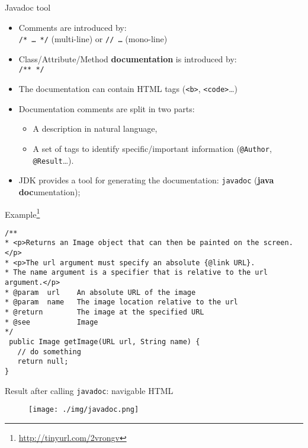 \documentclass[English,c,%
hyperref={%
    pdftitle={FISA-DE2 OOP in Java},%
    pdfauthor={Muller, Gravier, Laforest, Subercaze},%
    pdfsubject={OOP in Java},%
    pdfkeywords={OOP, Java}%
    },%
xcolor={pdftex,svgnames} %
]{beamer}
\begin{document}
\begin{frame}{Javadoc tool}
\begin{itemize}
  \item Comments are introduced by:\\
  \texttt{/* \ldots{} */} (multi-line) or \texttt{// \ldots{}} (mono-line)
  \item Class/Attribute/Method \textbf{documentation} is introduced by:\\
  \texttt{/** */}
  \item The documentation can contain HTML tags (\texttt{<b>}, \texttt{<code>}\ldots{})
  \item Documentation comments are split in two parts:
  {\small
    \begin{itemize}
      \item A description in natural language,
      \item A set of tags to identify specific/important information (\texttt{@Author}, \texttt{@Result}\ldots{}).
    \end{itemize}
  }
  \item JDK provides a tool for generating the documentation: \texttt{javadoc} (\textbf{java doc}umentation);
\end{itemize}
\end{frame}



\begin{frame}[fragile]{Example\footnote{\url{http://tinyurl.com/2vrongv}}}
\vspace{-1.3em}
{\small
  \begin{lstlisting}[escapechar=\%,label=intex,caption=JavadocExample.java,basicstyle=\footnotesize]
/**
* <p>Returns an Image object that can then be painted on the screen.</p>
* <p>The url argument must specify an absolute {@link URL}.
* The name argument is a specifier that is relative to the url argument.</p>
* @param  url    An absolute URL of the image
* @param  name   The image location relative to the url
* @return        The image at the specified URL
* @see           Image
*/
 public Image getImage(URL url, String name) {
   // do something
   return null;
}
\end{lstlisting}
}
\end{frame}


\begin{frame}{Result after calling \texttt{javadoc}: navigable HTML}
\begin{figure}
\texttt{[image: ./img/javadoc.png]}
\end{figure}
\end{frame}
\end{document}
